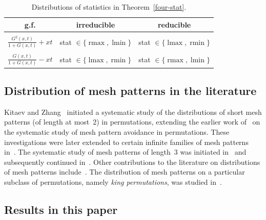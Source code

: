 \documentclass[12pt]{article}
\DeclareMathOperator{\rmax}{rmax}
\DeclareMathOperator{\lmax}{lmax}
\DeclareMathOperator{\rmin}{rmin}
\DeclareMathOperator{\lmin}{lmin}
\begin{document}
\begin{table}[htbp]
	\centering
	\begin{tabular}{c|c|c}
		g.f. & irreducible & reducible \\
		\hline
		& & \\[-2mm]
		$\frac{G^2(x,t)}{1+G(x,t)} + xt$
		& stat $\in \{\rmax, \lmin\}$
		& stat $\in \{\lmax, \rmin\}$ \\[2mm]
		\hline
		& & \\[-2mm]
		$\frac{G(x,t)}{1+G(x,t)} - xt$
		& stat $\in \{\lmax, \rmin\}$
		& stat $\in \{\rmax, \lmin\}$
	\end{tabular} 
	\caption{Distributions of statistics in Theorem~\ref{four-stat}.}
	\label{tab-dist-rmax-thm}
\end{table}

\subsection{Distribution of mesh patterns in the literature}

Kitaev and Zhang~\cite{KZ} initiated a systematic study of the distributions of short mesh patterns (of length at most~2) in permutations, extending the earlier work of~\cite{Hilmarsson2015Wilf} on the systematic study of mesh pattern avoidance in permutations. These investigations were later extended to certain infinite families of mesh patterns in~\cite{KZZ}. The systematic study of mesh patterns of length~3 was initiated in~\cite{KLv} and subsequently continued in~\cite{LvZhang,LvZhang1}. Other contributions to the literature on distributions of mesh patterns include~\cite{FFKL,HanZeng,HanZeng1}. The distribution of mesh patterns on a particular subclass of permutations, namely \emph{king permutations}, was studied in~\cite{LiZhang}.

\subsection{Results in this paper}
\end{document}
